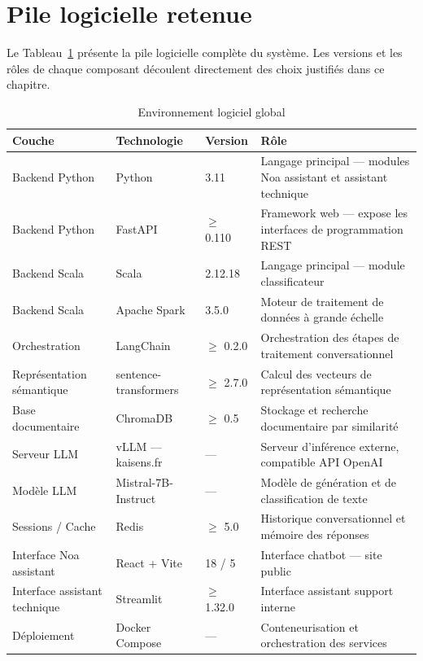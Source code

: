 \section{Pile logicielle retenue}

Le Tableau~\ref{tab:env_logiciel} présente la pile logicielle complète du système.
Les versions et les rôles de chaque composant découlent directement des choix
justifiés dans ce chapitre.

\vspace{6pt}
\begin{table}[H]
\caption{Environnement logiciel global}
\label{tab:env_logiciel}
\centering
\small
\setlength{\tabcolsep}{3pt}
\begin{tabular}{|p{2.5cm}|p{4.5cm}|p{1.8cm}|p{5.5cm}|}
\hline
\textbf{Couche} & \textbf{Technologie} & \textbf{Version} & \textbf{Rôle} \\
\hline
Backend Python  & Python               & 3.11             & Langage principal — modules Noa assistant et assistant technique \\
\hline
Backend Python  & FastAPI \cite{fastapi} & $\geq$ 0.110   & Framework web — expose les interfaces de programmation REST \\
\hline
Backend Scala   & Scala                & 2.12.18          & Langage principal — module classificateur \\
\hline
Backend Scala   & Apache Spark         & 3.5.0            & Moteur de traitement de données à grande échelle \\
\hline
Orchestration   & LangChain \cite{langchain} & $\geq$ 0.2.0 & Orchestration des étapes de traitement conversationnel \\
\hline
Représentation sémantique & sentence-transformers \cite{sbert} & $\geq$ 2.7.0 & Calcul des vecteurs de représentation sémantique \\
\hline
Base documentaire & ChromaDB \cite{chromadb} & $\geq$ 0.5    & Stockage et recherche documentaire par similarité \\
\hline
Serveur LLM     & vLLM — kaisens.fr \cite{vllm2023} & —       & Serveur d'inférence externe, compatible API OpenAI \\
\hline
Modèle LLM      & Mistral-7B-Instruct \cite{mistral2023} & —   & Modèle de génération et de classification de texte \\
\hline
Sessions / Cache & Redis \cite{redis}  & $\geq$ 5.0       & Historique conversationnel et mémoire des réponses \\
\hline
Interface Noa assistant   & React + Vite         & 18 / 5           & Interface chatbot — site public \\
\hline
Interface assistant technique & Streamlit          & $\geq$ 1.32.0    & Interface assistant support interne \\
\hline
Déploiement     & Docker Compose \cite{docker} & —          & Conteneurisation et orchestration des services \\
\hline
\end{tabular}
\end{table}

